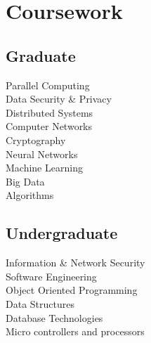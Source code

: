 \documentclass[]{main}
\begin{document}
\begin{minipage}[t]{0.73\textwidth}
\end{minipage} 

\newpage

\begin{minipage}[t]{0.25\textwidth} 


\section{Coursework}

\subsection{Graduate}
\sectionsep
Parallel Computing\\
Data Security \& Privacy\\
Distributed Systems\\
Computer Networks\\
Cryptography\\
Neural Networks\\
Machine Learning\\
Big Data\\
Algorithms\\
\sectionsep

\subsection{Undergraduate}
\sectionsep
Information \& Network Security\\
Software Engineering\\
Object Oriented Programming\\
Data Structures\\
Database Technologies\\
Micro controllers and processors\\
\sectionsep



\end{minipage} 
\end{document}
